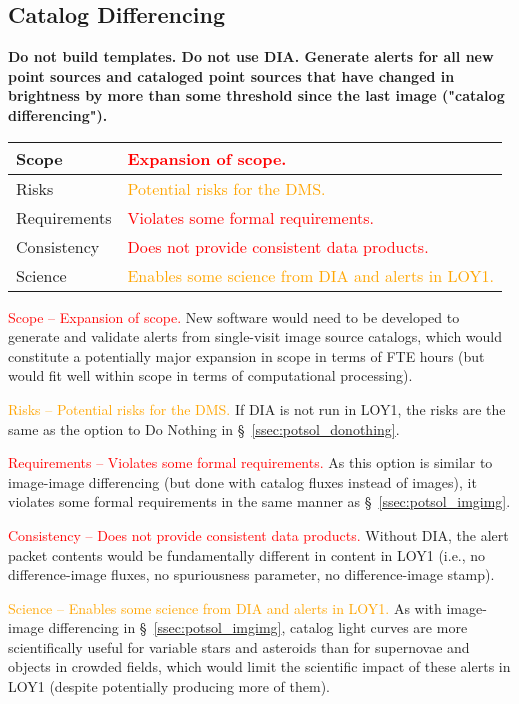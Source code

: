 \documentclass[DM,lsstdraft,toc]{lsstdoc}
\begin{document}
\clearpage
\subsection{Catalog Differencing}\label{ssec:potsol_catdiff}

{\bf Do not build templates. Do not use DIA. Generate alerts for all new point sources and cataloged point sources that have changed in brightness by more than some threshold since the last image ("catalog differencing").}

\begin{center}
\begin{tabular}{|p{2.5cm}|p{13cm}|}
\hline
Scope & \textcolor{red}{Expansion of scope.}  \\
\hline
Risks & \textcolor{orange}{Potential risks for the DMS.} \\
\hline
Requirements & \textcolor{red}{Violates some formal requirements.} \\
\hline
Consistency & \textcolor{red}{Does not provide consistent data products.} \\
\hline
Science & \textcolor{orange}{Enables some science from DIA and alerts in LOY1.} \\
\hline
\end{tabular}
\end{center}

\textcolor{red}{Scope -- Expansion of scope.}
New software would need to be developed to generate and validate alerts from single-visit image source catalogs, which would constitute a potentially major expansion in scope in terms of FTE hours (but would fit well within scope in terms of computational processing).

\textcolor{orange}{Risks -- Potential risks for the DMS.}
If DIA is not run in LOY1, the risks are the same as the option to Do Nothing in \S~\ref{ssec:potsol_donothing}. 

\textcolor{red}{Requirements -- Violates some formal requirements.}
As this option is similar to image-image differencing (but done with catalog fluxes instead of images), it violates some formal requirements in the same manner as \S~\ref{ssec:potsol_imgimg}. 

\textcolor{red}{Consistency -- Does not provide consistent data products.}
Without DIA, the alert packet contents would be fundamentally different in content in LOY1 (i.e., no difference-image fluxes, no spuriousness parameter, no difference-image stamp).

\textcolor{orange}{Science -- Enables some science from DIA and alerts in LOY1.}
As with image-image differencing in \S~\ref{ssec:potsol_imgimg}, catalog light curves are more scientifically useful for variable stars and asteroids than for supernovae and objects in crowded fields, which would limit the scientific impact of these alerts in LOY1 (despite potentially producing more of them).
\end{document}
